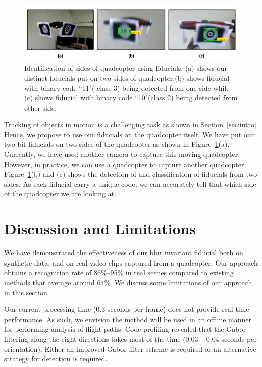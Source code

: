 \begin{figure}[hb!]
  \includegraphics[width=\linewidth]{figures/fiducial/fiducialOnDrone}
  \caption[Fiducials on Quadcopter]{Identification of sides of quadcopter using
  fiducials. (a) shows our distinct fiducials put on two sides of
  quadcopter.(b) shows fiducial with binary code ``11"( class 3) being detected
  from one side while (c) shows fiducial with binary code ``10"(class 2) being
  detected from other side.}
  \label{fig:fiducialOnDrone}
\end{figure}

Tracking of objects in motion is a challenging task as shown in
Section~\ref{sec:intro}. Hence, we propose to use our fiducials on the
quadcopter itself. We have put our two-bit fiducials on two sides of the
quadcopter as shown in Figure~\ref{fig:fiducialOnDrone}(a). 
Currently, we have used another camera to capture this moving quadcopter.
However, in practice, we can use a quadcopter to capture another quadcopter.
Figure~\ref{fig:fiducialOnDrone}(b) and (c) shows the detection of
and classification of fiducials from two sides. As each fiducial carry a
unique code, we can accurately tell that which side of the quadcopter we are
looking at.

\section{Discussion and Limitations}\label{sec:discussion}

We have demonstrated the effectiveness of our blur invariant fiducial
both on synthetic data, and on real video clips captured from a quadcopter.
Our approach obtains a recognition rate of 86\%--95\% 
in real scenes compared to existing methods that average around
64\%.  We discuss some limitations of our approach in this section.

Our  current processing time (0.3 seconds per frame) does not provide
real-time performance.  As such, we envision the method will be used in an
offline manner for performing analysis of flight paths. Code profiling revealed
that the Gabor filtering along the eight directions takes most of the time
(0.03 -- 0.04 seconds per orientation).  Either an improved Gabor filter scheme
is required or an alternative strategy for detection is required.

